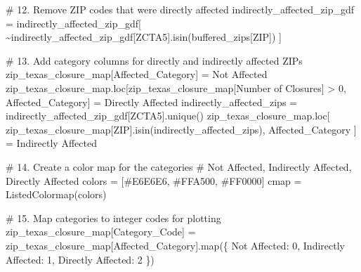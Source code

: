\documentclass[
  letterpaper,
  DIV=11,
  numbers=noendperiod]{scrartcl}
\newenvironment{Shaded}{\begin{snugshade}}{\end{snugshade}}
\newcommand{\BuiltInTok}[1]{\textcolor[rgb]{0.00,0.23,0.31}{#1}}
\newcommand{\CommentTok}[1]{\textcolor[rgb]{0.37,0.37,0.37}{#1}}
\newcommand{\DecValTok}[1]{\textcolor[rgb]{0.68,0.00,0.00}{#1}}
\newcommand{\NormalTok}[1]{\textcolor[rgb]{0.00,0.23,0.31}{#1}}
\newcommand{\OperatorTok}[1]{\textcolor[rgb]{0.37,0.37,0.37}{#1}}
\newcommand{\StringTok}[1]{\textcolor[rgb]{0.13,0.47,0.30}{#1}}
\begin{document}
\begin{Shaded}
\begin{Highlighting}[]
\CommentTok{\# 12. Remove ZIP codes that were directly affected}
\NormalTok{indirectly\_affected\_zip\_gdf }\OperatorTok{=}\NormalTok{ indirectly\_affected\_zip\_gdf[}
    \OperatorTok{\textasciitilde{}}\NormalTok{indirectly\_affected\_zip\_gdf[}\StringTok{\textquotesingle{}ZCTA5\textquotesingle{}}\NormalTok{].isin(buffered\_zips[}\StringTok{\textquotesingle{}ZIP\textquotesingle{}}\NormalTok{])}
\NormalTok{]}

\CommentTok{\# 13. Add category columns for directly and indirectly affected ZIPs}
\NormalTok{zip\_texas\_closure\_map[}\StringTok{\textquotesingle{}Affected\_Category\textquotesingle{}}\NormalTok{] }\OperatorTok{=} \StringTok{\textquotesingle{}Not Affected\textquotesingle{}}
\NormalTok{zip\_texas\_closure\_map.loc[zip\_texas\_closure\_map[}\StringTok{\textquotesingle{}Number of Closures\textquotesingle{}}\NormalTok{]}
                          \OperatorTok{\textgreater{}} \DecValTok{0}\NormalTok{, }\StringTok{\textquotesingle{}Affected\_Category\textquotesingle{}}\NormalTok{] }\OperatorTok{=} \StringTok{\textquotesingle{}Directly Affected\textquotesingle{}}
\NormalTok{indirectly\_affected\_zips }\OperatorTok{=}\NormalTok{ indirectly\_affected\_zip\_gdf[}\StringTok{\textquotesingle{}ZCTA5\textquotesingle{}}\NormalTok{].unique()}
\NormalTok{zip\_texas\_closure\_map.loc[}
\NormalTok{    zip\_texas\_closure\_map[}\StringTok{\textquotesingle{}ZIP\textquotesingle{}}\NormalTok{].isin(indirectly\_affected\_zips),}
    \StringTok{\textquotesingle{}Affected\_Category\textquotesingle{}}
\NormalTok{] }\OperatorTok{=} \StringTok{\textquotesingle{}Indirectly Affected\textquotesingle{}}

\CommentTok{\# 14. Create a color map for the categories}
\CommentTok{\# Not Affected, Indirectly Affected, Directly Affected}
\NormalTok{colors }\OperatorTok{=}\NormalTok{ [}\StringTok{\textquotesingle{}\#E6E6E6\textquotesingle{}}\NormalTok{, }\StringTok{\textquotesingle{}\#FFA500\textquotesingle{}}\NormalTok{, }\StringTok{\textquotesingle{}\#FF0000\textquotesingle{}}\NormalTok{]}
\NormalTok{cmap }\OperatorTok{=}\NormalTok{ ListedColormap(colors)}

\CommentTok{\# 15. Map categories to integer codes for plotting}
\NormalTok{zip\_texas\_closure\_map[}\StringTok{\textquotesingle{}Category\_Code\textquotesingle{}}\NormalTok{] }\OperatorTok{=}\NormalTok{ zip\_texas\_closure\_map[}\StringTok{\textquotesingle{}Affected\_Category\textquotesingle{}}\NormalTok{].}\BuiltInTok{map}\NormalTok{(\{}
    \StringTok{\textquotesingle{}Not Affected\textquotesingle{}}\NormalTok{: }\DecValTok{0}\NormalTok{,}
    \StringTok{\textquotesingle{}Indirectly Affected\textquotesingle{}}\NormalTok{: }\DecValTok{1}\NormalTok{,}
    \StringTok{\textquotesingle{}Directly Affected\textquotesingle{}}\NormalTok{: }\DecValTok{2}
\NormalTok{\})}


\end{Highlighting}
\end{Shaded}
\end{document}
